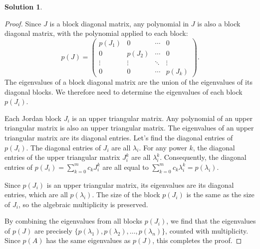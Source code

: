 \documentclass[12pt]{article}
\theoremstyle{definition}
\newtheorem*{solution}{\normalfont\textbf{Solution}}
\begin{document}
\begin{enumerate}[leftmargin=*]
\begin{solution}
\begin{proof}
                Since $J$ is a block diagonal matrix, any polynomial in $J$ is also a block diagonal matrix, with the polynomial applied to each block:
                \[
                p(J) = \begin{pmatrix}
                p(J_1) & 0 & \cdots & 0 \\
                0 & p(J_2) & \cdots & 0 \\
                \vdots & \vdots & \ddots & \vdots \\
                0 & 0 & \cdots & p(J_k)
                \end{pmatrix}
                .\]
                The eigenvalues of a block diagonal matrix are the union of the eigenvalues of its diagonal blocks. We therefore need to determine the eigenvalues of each block $p(J_i)$.

                Each Jordan block $J_i$ is an upper triangular matrix. Any polynomial of an upper triangular matrix is also an upper triangular matrix. The eigenvalues of an upper triangular matrix are its diagonal entries. Let's find the diagonal entries of $p(J_i)$.
                The diagonal entries of $J_i$ are all $\lambda_i$.
                For any power $k$, the diagonal entries of the upper triangular matrix $J_i^k$ are all $\lambda_i^k$.
                Consequently, the diagonal entries of $p(J_i) = \sum_{k=0}^{m} c_k J_i^k$ are all equal to $\sum_{k=0}^{m} c_k \lambda_i^k = p(\lambda_i)$.

                Since $p(J_i)$ is an upper triangular matrix, its eigenvalues are its diagonal entries, which are all $p(\lambda_i)$. The size of the block $p(J_i)$ is the same as the size of $J_i$, so the algebraic multiplicity is preserved.

                By combining the eigenvalues from all blocks $p(J_i)$, we find that the eigenvalues of $p(J)$ are precisely $\{p(\lambda_1), p(\lambda_2), \ldots, p(\lambda_n)\}$, counted with multiplicity. Since $p(A)$ has the same eigenvalues as $p(J)$, this completes the proof.
            \end{proof}
    \end{solution}
    

\end{enumerate}
\end{document}
